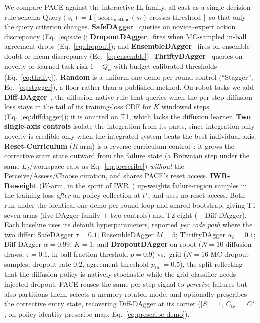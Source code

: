 \documentclass[letterpaper]{article} %
\begin{document}
We compare PACE against the interactive-IL family, all cast as a single decision-rule
schema $\mathrm{Query}(s_t)=\mathbf{1}[\,\mathrm{score}_\mathrm{method}(s_t)\ \text{crosses threshold}\,]$
so that only the query criterion changes. \textbf{SafeDAgger}~\cite{zhang2017safedagger}
queries on novice--expert action discrepancy (Eq.~\ref{eq:safe});
\textbf{DropoutDAgger}~\cite{menda2017dropoutdagger,gal2016dropout} fires when
MC-sampled in-ball agreement drops (Eq.~\ref{eq:dropout}); and
\textbf{EnsembleDAgger}~\cite{menda2019ensembledagger,lakshminarayanan2017ensembles}
fires on ensemble doubt or mean discrepancy (Eq.~\ref{eq:ensemble}).
\textbf{ThriftyDAgger}~\cite{hoque2021thriftydagger} queries on novelty or learned
task risk $1-Q_\psi$ with budget-calibrated thresholds (Eq.~\ref{eq:thrifty}).
\textbf{Random} is a uniform one-demo-per-round control (``Stagger'',
Eq.~\ref{eq:stagger}), a floor rather than a published method. On robot tasks we
add \textbf{Diff-DAgger}~\cite{lee2025diffdagger}, the diffusion-native rule that
queries when the per-step diffusion loss stays in the tail of its training-loss CDF
for $K$ windowed steps (Eq.~\ref{eq:diffdagger}); it is omitted on T1, which lacks
the diffusion learner. \textbf{Two single-axis controls} isolate the integration from its parts, since
integration-only novelty is credible only when the integrated system beats the best
individual axis. \textbf{Reset-Curriculum} ($R$-arm) is a reverse-curriculum
control~\cite{florensa2017reversecurriculum}: it grows the corrective start state
outward from the failure state (a Brownian step under the same $L_2$/workspace caps as
Eq.~\ref{eq:prescribe}) \emph{without} the Perceive/Assess/Choose curation, and shares
PACE's reset access. \textbf{IWR-Reweight} ($W$-arm, in the spirit of
IWR~\cite{mandlekar2020iwr}) up-weights failure-region samples in the training loss
\emph{after} on-policy collection at $t^\star$, and uses no reset access. Both run
under the identical one-demo-per-round loop and shared bootstrap, giving T1 seven arms
(five DAgger-family $+$ two controls) and T2 eight ($+$ Diff-DAgger). Each baseline
uses its default hyperparameters, reported \emph{per code path} where the two differ:
SafeDAgger $\tau=0.1$; EnsembleDAgger $M=5$; ThriftyDAgger $\alpha_h=0.1$;
Diff-DAgger $\alpha=0.99$, $K=1$; and \textbf{DropoutDAgger} on robot ($N=10$
diffusion draws, $\tau=0.1$, in-ball fraction threshold $p=0.9$) vs.\ grid ($N=16$
MC-dropout samples, dropout rate $0.2$, agreement threshold $p_{\mathrm{thr}}=0.5$),
the split reflecting that the diffusion policy is natively stochastic while the grid
classifier needs injected dropout. PACE reuses the same per-step signal to
\emph{perceive} failures but also partitions them, selects a memory-rotated mode, and
optionally prescribes the corrective entry state, recovering Diff-DAgger at its corner
($|S|=1$, $C_\mathrm{tgt}=C^\star$, on-policy identity prescribe map,
Eq.~\ref{eq:prescribe-demo}).
\end{document}
